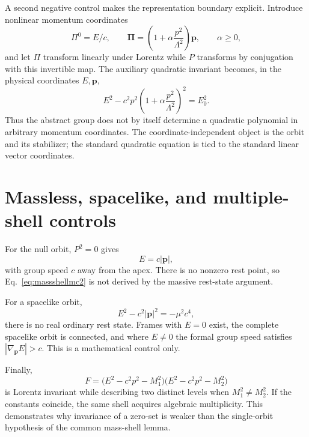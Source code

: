 \documentclass[11pt,a4paper]{article}
\begin{document}
A second negative control makes the representation boundary explicit.  Introduce nonlinear momentum coordinates
\begin{equation}
\Pi^0=E/c,
\qquad
\boldsymbol\Pi=\left(1+\alpha\frac{p^2}{\Lambda^2}\right)\mathbf p,
\qquad \alpha\ge0,
\end{equation}
and let $\Pi$ transform linearly under Lorentz while $P$ transforms by conjugation with this invertible map.  The auxiliary quadratic invariant becomes, in the physical coordinates $E,\mathbf p$,
\begin{equation}
E^2-c^2p^2\left(1+\alpha\frac{p^2}{\Lambda^2}\right)^2=E_0^2.
\label{eq:nonlinearshell}
\end{equation}
Thus the abstract group does not by itself determine a quadratic polynomial in arbitrary momentum coordinates.  The coordinate-independent object is the orbit and its stabilizer; the standard quadratic equation is tied to the standard linear vector coordinates.

\section{Massless, spacelike, and multiple-shell controls}
For the null orbit, $P^2=0$ gives
\begin{equation}
E=c|\mathbf p|,
\end{equation}
with group speed $c$ away from the apex.  There is no nonzero rest point, so Eq.~\eqref{eq:massshellmc2} is not derived by the massive rest-state argument.

For a spacelike orbit,
\begin{equation}
E^2-c^2|\mathbf p|^2=-\mu^2c^4,
\end{equation}
there is no real ordinary rest state.  Frames with $E=0$ exist, the complete spacelike orbit is connected, and where $E\neq0$ the formal group speed satisfies $|\nabla_{\mathbf p}E|>c$.  This is a mathematical control only.

Finally,
\begin{equation}
F=\bigl(E^2-c^2p^2-M_1^2\bigr)
  \bigl(E^2-c^2p^2-M_2^2\bigr)
\end{equation}
is Lorentz invariant while describing two distinct levels when $M_1^2\neq M_2^2$.  If the constants coincide, the same shell acquires algebraic multiplicity.  This demonstrates why invariance of a zero-set is weaker than the single-orbit hypothesis of the common mass-shell lemma.
\end{document}
